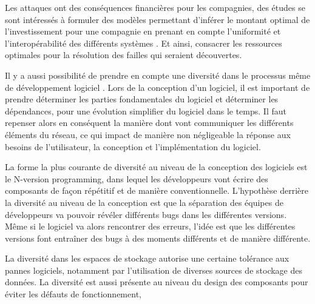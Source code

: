 Les attaques ont des conséquences financières pour les compagnies, des études se sont intéressés à formuler des modèles permettant d’inférer le montant optimal de l’investissement pour une compagnie en prenant en compte l’uniformité et l’interopérabilité des différents systèmes \cite{informationSecurity}. Et ainsi, consacrer les ressources optimales pour la résolution des failles qui seraient découvertes. 

Il y a aussi possibilité de prendre en compte une diversité dans le processus même de développement logiciel \cite{processDiversity}. 
Lors de la conception d’un logiciel, il est important de prendre déterminer les parties fondamentales du logiciel et déterminer les dépendances, pour une évolution simplifier du logiciel dans le temps. Il faut repenser alors en conséquent la manière dont vont communiquer les différents éléments du réseau, ce qui impact de manière non négligeable la réponse aux besoins de l'utilisateur, la conception et l'implémentation du logiciel.

La forme la plus courante de diversité au niveau de la conception des logiciels est le N-version programming\cite{ NversionProgramming }, dans lequel les développeurs vont écrire des composants de façon répétitif et de manière conventionnelle. L’hypothèse derrière la diversité au niveau de la conception est que la séparation des équipes de développeurs va pouvoir révéler différents bugs dans les différentes versions. Même si le logiciel va alors rencontrer des erreurs, l’idée est que les différentes versions font entraîner des bugs à des moments différents et de manière différente. 

La diversité dans les espaces de stockage  autorise une certaine tolérance aux pannes logiciels\cite{dataDiversity}, notamment par l'utilisation de diverses sources de stockage des données. La diversité est aussi présente au niveau du design des composants pour éviter les défauts de fonctionnement\cite{SecurityThroughDiversity},

